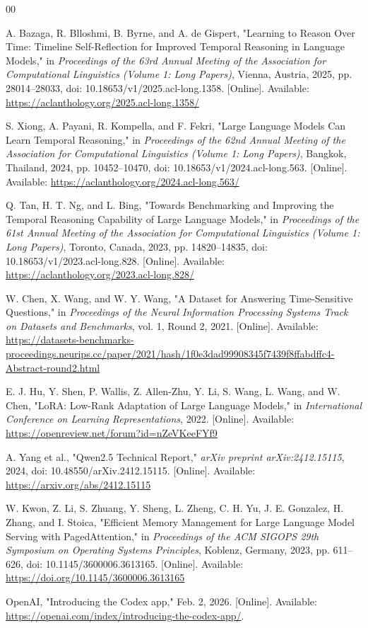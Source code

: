 \documentclass[conference]{IEEEtran}
\begin{document}
\begin{thebibliography}{00}

A. Bazaga, R. Blloshmi, B. Byrne, and A. de Gispert,
"Learning to Reason Over Time: Timeline Self-Reflection for Improved Temporal Reasoning in Language Models,"
in \emph{Proceedings of the 63rd Annual Meeting of the Association for Computational Linguistics (Volume 1: Long Papers)}, Vienna, Austria, 2025, pp. 28014--28033, doi: 10.18653/v1/2025.acl-long.1358. [Online]. Available: \url{https://aclanthology.org/2025.acl-long.1358/}

S. Xiong, A. Payani, R. Kompella, and F. Fekri,
"Large Language Models Can Learn Temporal Reasoning,"
in \emph{Proceedings of the 62nd Annual Meeting of the Association for Computational Linguistics (Volume 1: Long Papers)}, Bangkok, Thailand, 2024, pp. 10452--10470, doi: 10.18653/v1/2024.acl-long.563. [Online]. Available: \url{https://aclanthology.org/2024.acl-long.563/}

Q. Tan, H. T. Ng, and L. Bing,
"Towards Benchmarking and Improving the Temporal Reasoning Capability of Large Language Models,"
in \emph{Proceedings of the 61st Annual Meeting of the Association for Computational Linguistics (Volume 1: Long Papers)}, Toronto, Canada, 2023, pp. 14820--14835, doi: 10.18653/v1/2023.acl-long.828. [Online]. Available: \url{https://aclanthology.org/2023.acl-long.828/}

W. Chen, X. Wang, and W. Y. Wang,
"A Dataset for Answering Time-Sensitive Questions,"
in \emph{Proceedings of the Neural Information Processing Systems Track on Datasets and Benchmarks}, vol. 1, Round 2, 2021. [Online]. Available: \url{https://datasets-benchmarks-proceedings.neurips.cc/paper/2021/hash/1f0e3dad99908345f7439f8ffabdffc4-Abstract-round2.html}

E. J. Hu, Y. Shen, P. Wallis, Z. Allen-Zhu, Y. Li, S. Wang, L. Wang, and W. Chen,
"LoRA: Low-Rank Adaptation of Large Language Models,"
in \emph{International Conference on Learning Representations}, 2022. [Online]. Available: \url{https://openreview.net/forum?id=nZeVKeeFYf9}

A. Yang et al.,
"Qwen2.5 Technical Report,"
\emph{arXiv preprint arXiv:2412.15115}, 2024, doi: 10.48550/arXiv.2412.15115. [Online]. Available: \url{https://arxiv.org/abs/2412.15115}

W. Kwon, Z. Li, S. Zhuang, Y. Sheng, L. Zheng, C. H. Yu, J. E. Gonzalez, H. Zhang, and I. Stoica,
"Efficient Memory Management for Large Language Model Serving with PagedAttention,"
in \emph{Proceedings of the ACM SIGOPS 29th Symposium on Operating Systems Principles}, Koblenz, Germany, 2023, pp. 611--626, doi: 10.1145/3600006.3613165. [Online]. Available: \url{https://doi.org/10.1145/3600006.3613165}

OpenAI,
"Introducing the Codex app," Feb. 2, 2026. [Online]. Available:
\url{https://openai.com/index/introducing-the-codex-app/}.

\end{thebibliography}
\end{document}
